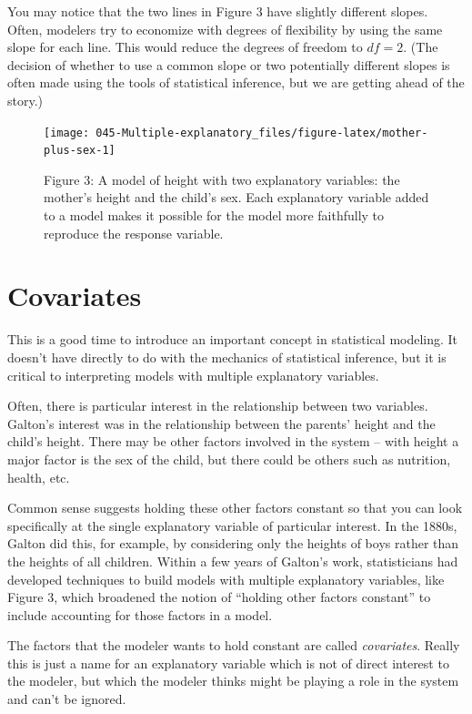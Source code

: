 \documentclass[]{book}
\begin{document}
You may notice that the two lines in Figure 3 have slightly different slopes. Often, modelers try to economize with degrees of flexibility by using the same slope for each line. This would reduce the degrees of freedom to \(df = 2\). (The decision of whether to use a common slope or two potentially different slopes is often made using the tools of statistical inference, but we are getting ahead of the story.)

\begin{figure}\texttt{[image: 045-Multiple-explanatory\_files/figure-latex/mother-plus-sex-1]} \caption{Figure 3: A model of height with two explanatory variables: the mother's height and the child's sex. Each explanatory variable added to a model makes it possible for the model more faithfully to reproduce the response variable.}\label{fig:mother-plus-sex}
\end{figure}



\hypertarget{covariates}{%
\section{Covariates}\label{covariates}}

This is a good time to introduce an important concept in statistical modeling. It doesn't have directly to do with the mechanics of statistical inference, but it is critical to interpreting models with multiple explanatory variables.

Often, there is particular interest in the relationship between two variables. Galton's interest was in the relationship between the parents' height and the child's height. There may be other factors involved in the system -- with height a major factor is the sex of the child, but there could be others such as nutrition, health, etc.

Common sense suggests holding these other factors constant so that you can look specifically at the single explanatory variable of particular interest. In the 1880s, Galton did this, for example, by considering only the heights of boys rather than the heights of all children. Within a few years of Galton's work, statisticians had developed techniques to build models with multiple explanatory variables, like Figure 3, which broadened the notion of ``holding other factors constant'' to include accounting for those factors in a model.

The factors that the modeler wants to hold constant are called \emph{covariates}. Really this is just a name for an explanatory variable which is not of direct interest to the modeler, but which the modeler thinks might be playing a role in the system and can't be ignored.
\end{document}

